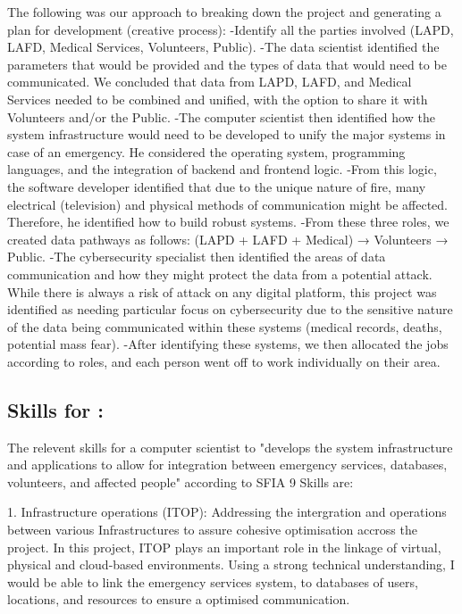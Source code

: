 \documentclass[a4paper, 11pt]{report}
\begin{document}
The following was our approach to breaking down the project and generating a plan for development (creative process):
-Identify all the parties involved (LAPD, LAFD, Medical Services, Volunteers, Public).
-The data scientist identified the parameters that would be provided and the types of data that would need to be communicated. We concluded that data from LAPD, LAFD, and Medical Services needed to be combined and unified, with the option to share it with Volunteers and/or the Public.
-The computer scientist then identified how the system infrastructure would need to be developed to unify the major systems in case of an emergency. He considered the operating system, programming languages, and the integration of backend and frontend logic.
-From this logic, the software developer identified that due to the unique nature of fire, many electrical (television) and physical methods of communication might be affected. Therefore, he identified how to build robust systems.
-From these three roles, we created data pathways as follows: (LAPD + LAFD + Medical) → Volunteers → Public.
-The cybersecurity specialist then identified the areas of data communication and how they might protect the data from a potential attack. While there is always a risk of attack on any digital platform, this project was identified as needing particular focus on cybersecurity due to the sensitive nature of the data being communicated within these systems (medical records, deaths, potential mass fear).
-After identifying these systems, we then allocated the jobs according to roles, and each person went off to work individually on their area.


\subsection{Skills for \majA: \studA}

The relevent skills for a computer scientist to "develops the system infrastructure and applications to allow for integration between emergency services, databases, volunteers, and affected people" according to SFIA 9 Skills are:

1. Infrastructure operations (ITOP): Addressing the intergration and operations between various Infrastructures to assure cohesive optimisation accross the project. In this project, ITOP plays an important role in the linkage of virtual, physical and cloud-based environments. Using a strong technical understanding, I  would be able to link the emergency services system, to databases of users, locations, and resources to ensure a optimised communication. 
\end{document}

